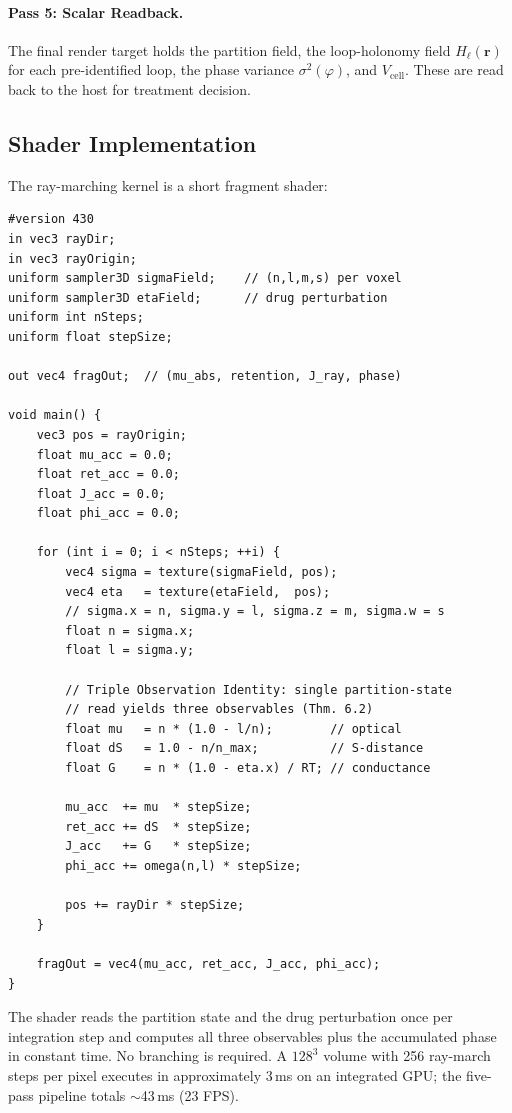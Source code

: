 \documentclass[twocolumn,10pt,a4paper]{article}
\theoremstyle{definition}
\theoremstyle{remark}
\newcommand{\Hol}{H}
\begin{document}
\paragraph{Pass 5: Scalar Readback.} The final render target holds the partition field, the loop-holonomy field $\Hol_\ell(\mathbf{r})$ for each pre-identified loop, the phase variance $\sigma^2(\varphi)$, and $V_{\mathrm{cell}}$. These are read back to the host for treatment decision.

\subsection{Shader Implementation}

The ray-marching kernel is a short fragment shader:

\begin{lstlisting}[style=glsl,caption={Triple-observation ray march (GLSL).},label={lst:glsl}]
#version 430
in vec3 rayDir;
in vec3 rayOrigin;
uniform sampler3D sigmaField;    // (n,l,m,s) per voxel
uniform sampler3D etaField;      // drug perturbation
uniform int nSteps;
uniform float stepSize;

out vec4 fragOut;  // (mu_abs, retention, J_ray, phase)

void main() {
    vec3 pos = rayOrigin;
    float mu_acc = 0.0;
    float ret_acc = 0.0;
    float J_acc = 0.0;
    float phi_acc = 0.0;

    for (int i = 0; i < nSteps; ++i) {
        vec4 sigma = texture(sigmaField, pos);
        vec4 eta   = texture(etaField,  pos);
        // sigma.x = n, sigma.y = l, sigma.z = m, sigma.w = s
        float n = sigma.x;
        float l = sigma.y;

        // Triple Observation Identity: single partition-state
        // read yields three observables (Thm. 6.2)
        float mu   = n * (1.0 - l/n);        // optical
        float dS   = 1.0 - n/n_max;          // S-distance
        float G    = n * (1.0 - eta.x) / RT; // conductance

        mu_acc  += mu  * stepSize;
        ret_acc += dS  * stepSize;
        J_acc   += G   * stepSize;
        phi_acc += omega(n,l) * stepSize;

        pos += rayDir * stepSize;
    }

    fragOut = vec4(mu_acc, ret_acc, J_acc, phi_acc);
}
\end{lstlisting}

The shader reads the partition state and the drug perturbation once per integration step and computes all three observables plus the accumulated phase in constant time. No branching is required. A $128^3$ volume with 256 ray-march steps per pixel executes in approximately 3\,ms on an integrated GPU; the five-pass pipeline totals $\sim$43\,ms (23 FPS).
\end{document}
